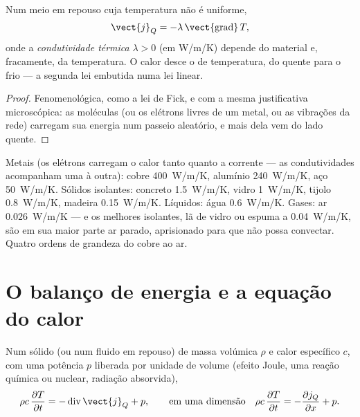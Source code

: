 \begin{theorem}\label{thm:b2:heat-conduction:fourier}
Num meio em repouso cuja temperatura não é uniforme,
\[
\vect{j}_Q = -\lambda\,\vect{\operatorname{grad}}\,T ,
\]
onde a \emph{condutividade térmica}
$\lambda > 0$ (em \unit{W/m/K}) depende do material e, fracamente, da
temperatura. O calor desce o  de temperatura, do quente para o
frio --- a segunda lei embutida numa lei linear.
\end{theorem}

\begin{proof}
Fenomenológica, como a lei de Fick, e com a mesma justificativa
microscópica: as moléculas (ou os elétrons livres de um metal, ou as
vibrações da rede) carregam sua energia num passeio aleatório, e mais
dela vem do lado quente.
\end{proof}

\begin{example}[Condutividades]\label{ex:b2:heat-conduction:values}
Metais (os elétrons carregam o calor tanto quanto a corrente ---
as condutividades acompanham uma à outra): cobre \qty{400}{W/m/K}, alumínio
\qty{240}{W/m/K}, aço \qty{50}{W/m/K}. Sólidos isolantes: concreto
\qty{1.5}{W/m/K}, vidro \qty{1}{W/m/K}, tijolo \qty{0.8}{W/m/K}, madeira
\qty{0.15}{W/m/K}. Líquidos: água \qty{0.6}{W/m/K}. Gases: ar
\qty{0.026}{W/m/K} --- e os melhores isolantes, lã de vidro ou espuma a
\qty{0.04}{W/m/K}, são em sua maior parte ar parado, aprisionado para que não
possa convectar. Quatro ordens de grandeza do cobre ao ar.
\end{example}

\section{O balanço de energia e a equação do calor}

\begin{theorem}\label{thm:b2:heat-conduction:balance}
Num sólido (ou num fluido em repouso) de massa volúmica $\rho$ e calor específico
$c$, com uma potência $p$ liberada por unidade de volume (efeito Joule, uma
reação química ou nuclear, radiação absorvida),
\[
\rho c\,\frac{\partial T}{\partial t} = -\operatorname{div}\vect{j}_Q + p ,
\qquad\text{em uma dimensão}\quad
\rho c\,\frac{\partial T}{\partial t} = -\frac{\partial j_Q}{\partial x} + p .
\]
\end{theorem}

